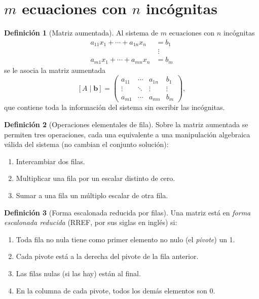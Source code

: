 \documentclass[11pt,letterpaper]{article}
\theoremstyle{definition}
\newtheorem{definicion}{Definición}[section]
\theoremstyle{plain}
\newcommand{\vv}[1]{\mathbf{#1}}
\begin{document}
\section{\texorpdfstring{$m$}{m} ecuaciones con \texorpdfstring{$n$}{n} incógnitas}

\begin{definicion}[Matriz aumentada]
Al sistema de $m$ ecuaciones con $n$ incógnitas
\[
\begin{aligned}
  a_{11}x_1 + \cdots + a_{1n}x_n &= b_1 \\
  &\;\vdots \\
  a_{m1}x_1 + \cdots + a_{mn}x_n &= b_m
\end{aligned}
\]
se le asocia la matriz aumentada
\[
  [A \mid \vv{b}] =
  \left(\begin{array}{ccc|c}
    a_{11} & \cdots & a_{1n} & b_1 \\
    \vdots & \ddots & \vdots & \vdots \\
    a_{m1} & \cdots & a_{mn} & b_m
  \end{array}\right),
\]
que contiene toda la información del sistema sin escribir las incógnitas.
\end{definicion}

\begin{definicion}[Operaciones elementales de fila]
Sobre la matriz aumentada se permiten tres operaciones, cada una equivalente a una manipulación
algebraica válida del sistema (no cambian el conjunto solución):
\begin{enumerate}[label=(\roman*)]
  \item Intercambiar dos filas.
  \item Multiplicar una fila por un escalar distinto de cero.
  \item Sumar a una fila un múltiplo escalar de otra fila.
\end{enumerate}
\end{definicion}

\begin{definicion}[Forma escalonada reducida por filas]
Una matriz está en \emph{forma escalonada reducida} (RREF, por sus siglas en inglés) si:
\begin{enumerate}[label=(\roman*)]
  \item Toda fila no nula tiene como primer elemento no nulo (el \emph{pivote}) un 1.
  \item Cada pivote está a la derecha del pivote de la fila anterior.
  \item Las filas nulas (si las hay) están al final.
  \item En la columna de cada pivote, todos los demás elementos son 0.
\end{enumerate}
\end{definicion}
\end{document}
